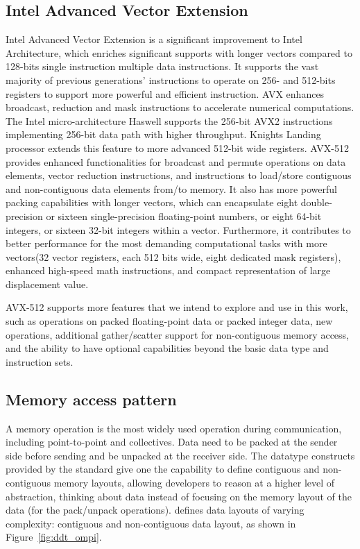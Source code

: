 \documentclass[conference]{IEEEtran}
\begin{document}
\subsection{Intel Advanced Vector Extension}
Intel Advanced Vector Extension is a significant improvement to Intel Architecture, which enriches
significant supports with longer vectors compared to 128-bits single instruction multiple data instructions.
It supports the vast majority of previous generations' instructions to operate on 256- and 512-bits registers to support
more powerful and efficient instruction.
%
AVX enhances broadcast, reduction and mask instructions to accelerate
numerical computations. The Intel micro-architecture Haswell supports the 256-bit AVX2 instructions
implementing 256-bit data path with higher throughput. Knights Landing processor
extends this feature to more advanced 512-bit wide registers. AVX-512 provides enhanced functionalities
for broadcast and permute operations on data elements, vector reduction instructions,
and instructions to load/store contiguous and non-contiguous data elements from/to memory.
It also has more powerful packing capabilities with longer vectors, which can encapsulate eight double-precision
or sixteen single-precision floating-point numbers, or eight 64-bit integers, or sixteen 32-bit integers within a vector.
Furthermore, it contributes to better performance for the most
demanding computational tasks with more vectors(32 vector registers, each 512 bits wide,
eight dedicated mask registers), enhanced high-speed math instructions,
and compact representation of large displacement value.

AVX-512 supports more features that we intend to explore and use in this work, such as operations on packed
floating-point data or packed integer data, new operations, additional
gather/scatter support for non-contiguous memory access, and the ability to have
optional capabilities beyond the basic data type and instruction sets.

\subsection{Memory access pattern}\label{ssec:datatypes}

A memory operation is the most widely used operation during communication, including point-to-point and collectives.
Data need to be packed at the sender side before sending and be unpacked at the receiver side.
The datatype constructs provided by the \mpi standard give one the capability
to define contiguous and non-contiguous memory layouts, allowing developers
to reason at a higher level of abstraction, thinking about data instead of focusing
on the memory layout of the data (for the pack/unpack operations). \mpi defines data
layouts of varying complexity: contiguous and non-contiguous data layout, as shown in Figure~\ref{fig:ddt_ompi}.
\end{document}
